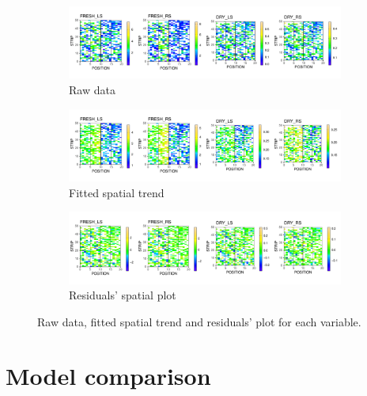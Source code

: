 \begin{figure}
	\begin{subfigure}[t]{\textwidth}
		\centering
		\includegraphics[width = \textwidth]{../../Figures/BSS_rawData_plot.pdf}
		\caption{Raw data}
	\end{subfigure}
	
	\begin{subfigure}[t]{\textwidth}
		\centering
		\includegraphics[width = \textwidth]{../../Figures/BSS_FittedData_plot.pdf}
		\caption{Fitted spatial trend}
	\end{subfigure}
	
	\begin{subfigure}[t]{\textwidth}
		\centering
		\includegraphics[width = \textwidth]{../../Figures/BSS_residuals_plot.pdf}
		\caption{Residuals' spatial plot}
	\end{subfigure}
	\caption{Raw data, fitted spatial trend and residuals' plot for each variable.}
	\label{fig:BSS_model_results}
\end{figure}

\section{Model comparison}
